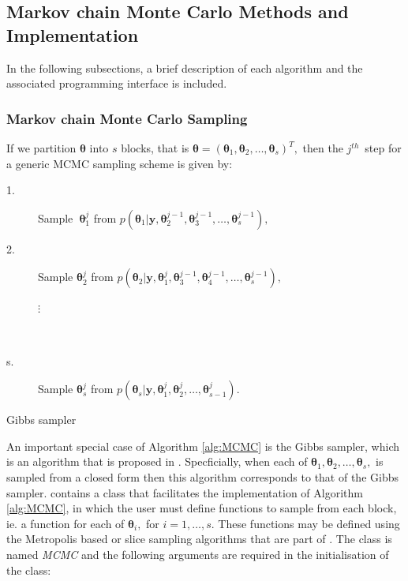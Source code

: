 \documentclass[article]{jss}
\begin{document}
\subsection{Markov chain Monte Carlo Methods and Implementation}

In the following subsections, a brief description of each algorithm
and the associated programming interface is included.


\subsubsection{Markov chain Monte Carlo Sampling}

If we partition $\bm{\theta}$ into $s$ blocks, that is
$\bm{\bm{\theta}}=\left(\bm{\theta}_{1},\bm{\theta}_{2},\ldots,\bm{\theta}_{s}\right)^{T},$
then the $j^{th}$\ step for a generic MCMC sampling scheme is given
by:

%
\begin{algorithm}[H]
\begin{description}
\item [{\textmd{1.}}] Sample\textbf{\ }$\bm{\theta}_{1}^{j}$ from $p\left(\bm{\theta}_{1}|\bm{y,}\bm{\theta}_{2}^{j-1},\bm{\theta}_{3}^{j-1},\ldots,\bm{\theta}_{s}^{j-1}\right),$ 
\item [{\textmd{2.}}] Sample $\bm{\theta}_{2}^{j}$ from $p\left(\bm{\theta}_{2}|\bm{y,}\bm{\theta}_{1}^{j},\bm{\theta}_{3}^{j-1},\bm{\theta}_{4}^{j-1},\ldots,\bm{\theta}_{s}^{j-1}\right),$

\begin{description}
\item [{$\vdots$}]~
\end{description}
\item [{\textmd{s.}}] Sample $\bm{\theta}_{s}^{j}$ from $p\left(\bm{\theta}_{s}|\bm{y,}\bm{\theta}_{1}^{j},\bm{\theta}_{2}^{j},\ldots,\bm{\theta}_{s-1}^{j}\right).$ 
\end{description}
\caption{Gibbs sampler}
\label{alg:MCMC}
\end{algorithm}


An important special case of Algorithm \ref{alg:MCMC} is the Gibbs
sampler, which is an algorithm that is proposed in . Specficially,
when each of $\bm{\theta}_{1},\bm{\theta}_{2},\dots,\bm{\theta}_{s},$
is sampled from a closed form then this algorithm corresponds to that
of the Gibbs sampler.  contains a class that facilitates
the implementation of Algorithm \ref{alg:MCMC}, in which the user must
define functions to sample from each block, ie. a function for each of
$\bm{\theta}_{i},$ for $i=1,\dots,s.$ These functions may be defined
using the Metropolis based or slice sampling algorithms that are part
of . The class is named \emph{MCMC }and the following
arguments are required in the initialisation of the class:
\end{document}
